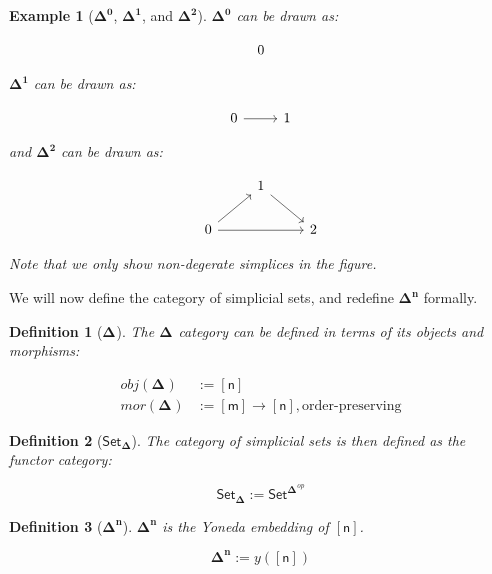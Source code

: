 \documentclass[10pt, titlepage]{amsart}
\newtheorem{definition}{Definition}
\newtheorem{example}{Example}
\newcommand{\Set}{\ensuremath{\mathsf{Set}}}
\newcommand{\Simplex}[1]{\ensuremath{\boldsymbol{\Delta^{#1}}}}
\newcommand{\SSet}{\ensuremath{\mathsf{Set}_{\boldsymbol{\Delta}}}}
\newcommand{\sq}[1]{\ensuremath{\mathsf{[#1]}}}
\begin{document}
\begin{example}[\Simplex{0}, \Simplex{1}, and \Simplex{2}]
  $\Simplex{0}$ can be drawn as:

  $$
    \begin{tikzcd}
      0
    \end{tikzcd}
  $$

  $\Simplex{1}$ can be drawn as:

  $$
    \begin{tikzcd}
      0 \arrow[r] & 1
    \end{tikzcd}
  $$

  and $\Simplex{2}$ can be drawn as:

  $$
    \begin{tikzcd}
      & 1 \arrow[dr] & \\
      0 \arrow[ur] \arrow[rr] & & 2
    \end{tikzcd}
  $$

  Note that we only show non-degerate simplices in the figure.
\end{example}

We will now define the category of simplicial sets, and redefine $\Simplex{n}$ formally.

\begin{definition}[\Simplex{}]
  The $\Simplex{}$ category can be defined in terms of its objects and morphisms:

  \begin{align*}
    obj(\Simplex{}) & := \sq{n}                                             \\
    mor(\Simplex{}) & := \sq{m} \rightarrow \sq{n}, \text{order-preserving}
  \end{align*}
\end{definition}

\begin{definition}[\SSet]
  The category of simplicial sets is then defined as the functor category:

  \begin{equation*}
    \SSet := \Set^{\Simplex{}^{op}}
  \end{equation*}
\end{definition}

\begin{definition}[\Simplex{n}]
  $\Simplex{n}$ is the Yoneda embedding of \sq{n}.

  \begin{equation*}
    \Simplex{n} := y(\sq{n})
  \end{equation*}
\end{definition}
\end{document}
